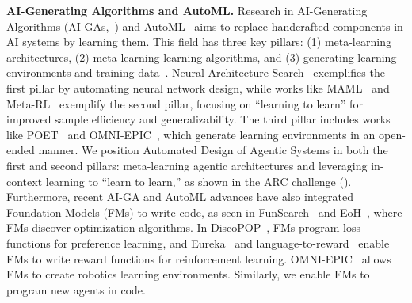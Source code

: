 \documentclass{article}
\newcommand{\problemlong}{Automated Design of Agentic Systems\xspace}
\begin{document}
\noindent\textbf{AI-Generating Algorithms and AutoML.}\hspace{0.5em} Research in AI-Generating Algorithms (AI-GAs,~\citet{clune2019aigas}) and AutoML~\citep{hutter2019automl} aims to replace handcrafted components in AI systems by learning them. This field has three key pillars: (1) meta-learning architectures, (2) meta-learning learning algorithms, and (3) generating learning environments and training data~\citep{clune2019aigas}. Neural Architecture Search~\citep{elsken2019neural,lu2019nsga,hu2021accelerating} exemplifies the first pillar by automating neural network design, while works like MAML~\citep{finn2017maml} and Meta-RL~\citep{wang2016learning,duan2017rlsquare,norman2023first,varibad,zintgraf2021exploration} exemplify the second pillar, focusing on “learning to learn” for improved sample efficiency and generalizability. The third pillar includes works like POET~\citep{wang2019poet,dharna2022transfer,wang2020enhanced} and OMNI-EPIC~\citep{faldor2024omni}, which generate learning environments in an open-ended manner. We position \problemlong in both the first and second pillars: meta-learning agentic architectures and leveraging in-context learning to “learn to learn,” as shown in the ARC challenge (). Furthermore, recent AI-GA and AutoML advances have also integrated Foundation Models (FMs) to write code, as seen in FunSearch~\citep{romera2024funSearch} and EoH~\citep{liu2024evolution}, where FMs discover optimization algorithms. In DiscoPOP~\citep{lu2024discopop}, FMs program loss functions for preference learning, and Eureka~\citep{maeureka} and language-to-reward~\citep{yu2023language} enable FMs to write reward functions for reinforcement learning. OMNI-EPIC~\citep{faldor2024omni} allows FMs to create robotics learning environments. Similarly, we enable FMs to program new agents in code.
\end{document}
